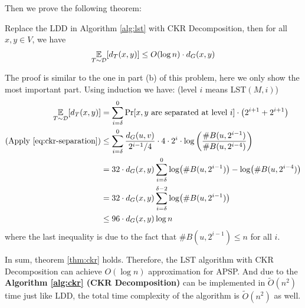 \begin{answer}
\begin{enumerate}[label=\alph*).]
        Then we prove the following theorem: 
        \begin{theorem}
            \label{thm:ckr}
            Replace the LDD in Algorithm \ref{alg:lst} with CKR Decomposition, then for all $x, y \in V$, we have
            \begin{align*}
                \operatorname*{\mathbb{E}}_{T\sim \mathcal{D}}[d_T(x, y)] \le O(\log n) \cdot d_G(x,y)
            \end{align*}
        \end{theorem}       
        The proof is similar to the one in part (b) of this problem, here we only show the most important part. 
        Using induction we have: (level $i$ means LST$(M, i)$)
        \begin{align*}
            \operatorname*{\mathbb{E}}_{T\sim \mathcal{D}}[d_T(x, y)] &= \sum_{i=\delta}^{0} \Pr[x, y\text{ are separated at level } i] \cdot \left(2^{i+1} + 2^{i+1}\right) \\
            (\text{Apply \eqref{eq:ckr-separation}}) &\le  \sum_{i=\delta}^{0} \frac{d_G(u,v)}{2^{i-1}/4} \cdot 4\cdot 2^i \cdot \log\left(\frac{\# B(u, 2^{i-1})}{\# B(u, 2^{i-4})}\right) \\
            &= 32 \cdot d_G(x,y) \sum_{i=\delta}^{0} \log (\# B(u, 2^{i-1})) - \log (\# B(u, 2^{i-4})) \\
            &= 32 \cdot d_G(x,y) \sum_{i=\delta}^{\delta-2} \log (\# B(u, 2^{i-1})) \\
            &\le 96 \cdot d_G(x,y) \log n
        \end{align*}    
        where the last inequality is due to the fact that $\# B(u, 2^{i-1}) \le n$ for all $i$.

        In sum, theorem \ref{thm:ckr} holds. Therefore, the LST algorithm with CKR Decomposition can achieve $O(\log n)$ approximation for APSP. 
        And due to the \textbf{Algorithm \ref{alg:ckr} (CKR Decomposition)} can be implemented in $\tilde{O}(n^2)$ time just like LDD, the total time complexity of the algorithm is $\tilde{O}(n^2)$ as well.
    \end{enumerate}
    \ed
\end{answer}